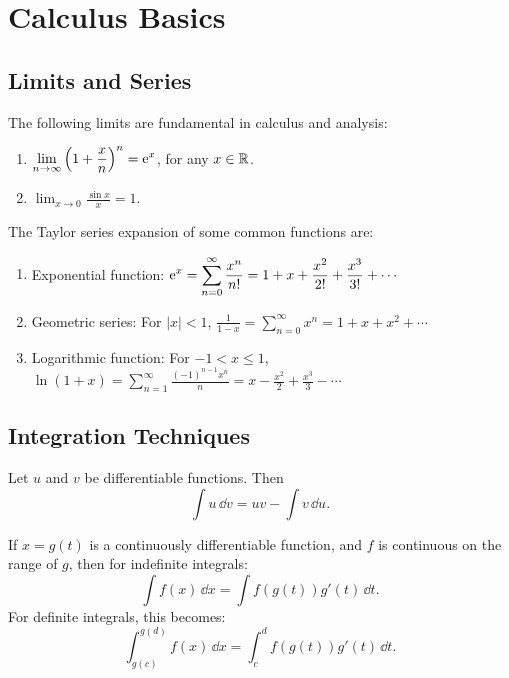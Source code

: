 \chapter{Calculus Basics}

\section{Limits and Series}

\begin{theorem}
  The following limits are fundamental in calculus and analysis:
  \begin{enumerate}
    \item $\displaystyle \lim_{n \to \infty} \left(1 + \frac{x}{n}\right)^n = \mathrm{e}^x$, for any $x \in \mathbb{R}$.
    \item $\displaystyle \lim_{x \to 0} \frac{\sin x}{x} = 1$.
  \end{enumerate}
\end{theorem}

\begin{theorem}
  The Taylor series expansion of some common functions are:
  \begin{enumerate}
    \item Exponential function: $\displaystyle \mathrm{e}^x = \sum_{n=0}^\infty \frac{x^n}{n!} = 1 + x + \frac{x^2}{2!} + \frac{x^3}{3!} + \cdots$
    \item Geometric series: For $|x| < 1$, $\displaystyle \frac{1}{1-x} = \sum_{n=0}^\infty x^n = 1 + x + x^2 + \cdots$
    \item Logarithmic function: For $-1 < x \le 1$, $\displaystyle \ln(1+x) = \sum_{n=1}^\infty \frac{(-1)^{n-1} x^n}{n} = x - \frac{x^2}{2} + \frac{x^3}{3} - \cdots$
  \end{enumerate}
\end{theorem}

\section{Integration Techniques}

\begin{theorem}
  Let $u$ and $v$ be differentiable functions. Then
  \[
    \int u\,\dd v = u v - \int v\,\dd u.
  \]
\end{theorem}

\begin{theorem}
  If $x = g(t)$ is a continuously differentiable function, and $f$ is continuous on the range of $g$, then for indefinite integrals:
  \[
    \int f(x)\,\dd x = \int f(g(t)) g'(t)\,\dd t.
  \]
  For definite integrals, this becomes:
  \[
    \int_{g(c)}^{g(d)} f(x)\,\dd x = \int_c^d f(g(t)) g'(t)\,\dd t.
  \]
\end{theorem}

